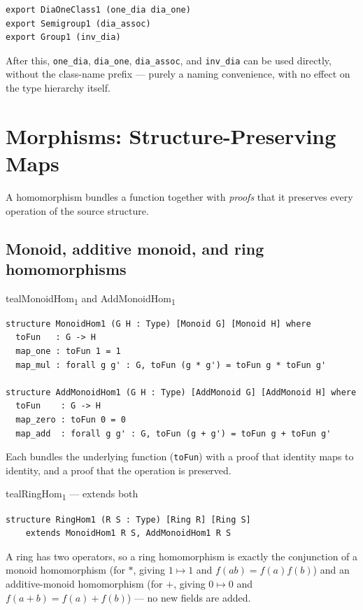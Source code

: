 \documentclass[11pt]{article}
\begin{document}
\begin{lstlisting}
export DiaOneClass1 (one_dia dia_one)
export Semigroup1 (dia_assoc)
export Group1 (inv_dia)
\end{lstlisting}

After this, \texttt{one\_dia}, \texttt{dia\_one}, \texttt{dia\_assoc}, and \texttt{inv\_dia} can be used directly, without the class-name prefix --- purely a naming convenience, with no effect on the type hierarchy itself.

\section{Morphisms: Structure-Preserving Maps}

A homomorphism bundles a function together with \emph{proofs} that it preserves every operation of the source structure.

\subsection{Monoid, additive monoid, and ring homomorphisms}

\begin{defbox}{teal}{MonoidHom\textsubscript{1} and AddMonoidHom\textsubscript{1}}
\begin{lstlisting}
structure MonoidHom1 (G H : Type) [Monoid G] [Monoid H] where
  toFun   : G -> H
  map_one : toFun 1 = 1
  map_mul : forall g g' : G, toFun (g * g') = toFun g * toFun g'

structure AddMonoidHom1 (G H : Type) [AddMonoid G] [AddMonoid H] where
  toFun    : G -> H
  map_zero : toFun 0 = 0
  map_add  : forall g g' : G, toFun (g + g') = toFun g + toFun g'
\end{lstlisting}
Each bundles the underlying function (\texttt{toFun}) with a proof that identity maps to identity, and a proof that the operation is preserved.
\end{defbox}

\begin{defbox}{teal}{RingHom\textsubscript{1} --- extends both}
\begin{lstlisting}
structure RingHom1 (R S : Type) [Ring R] [Ring S]
    extends MonoidHom1 R S, AddMonoidHom1 R S
\end{lstlisting}
A ring has two operators, so a ring homomorphism is exactly the conjunction of a monoid homomorphism (for $*$, giving $1\mapsto 1$ and $f(ab)=f(a)f(b)$) and an additive-monoid homomorphism (for $+$, giving $0\mapsto 0$ and $f(a+b)=f(a)+f(b)$) --- no new fields are added.
\end{defbox}
\end{document}
